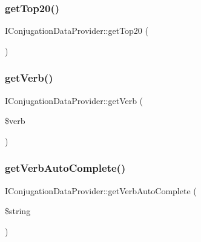 \hypertarget{interface_i_conjugation_data_provider_a96c98a3a99a79c0a4228a585c5294576}{}\label{interface_i_conjugation_data_provider_a96c98a3a99a79c0a4228a585c5294576} 
\subsubsection{\texorpdfstring{get\+Top20()}{getTop20()}}
{\footnotesize\ttfamily I\+Conjugation\+Data\+Provider\+::get\+Top20 (\begin{DoxyParamCaption}{ }\end{DoxyParamCaption})}

\hypertarget{interface_i_conjugation_data_provider_a528f3344f0463077e305886ebcc031a6}{}\label{interface_i_conjugation_data_provider_a528f3344f0463077e305886ebcc031a6} 
\subsubsection{\texorpdfstring{get\+Verb()}{getVerb()}}
{\footnotesize\ttfamily I\+Conjugation\+Data\+Provider\+::get\+Verb (\begin{DoxyParamCaption}\item[{}]{\$verb }\end{DoxyParamCaption})}

\hypertarget{interface_i_conjugation_data_provider_abc704f44a3eaec66a9d2461c9be1240b}{}\label{interface_i_conjugation_data_provider_abc704f44a3eaec66a9d2461c9be1240b} 
\subsubsection{\texorpdfstring{get\+Verb\+Auto\+Complete()}{getVerbAutoComplete()}}
{\footnotesize\ttfamily I\+Conjugation\+Data\+Provider\+::get\+Verb\+Auto\+Complete (\begin{DoxyParamCaption}\item[{}]{\$string }\end{DoxyParamCaption})}


